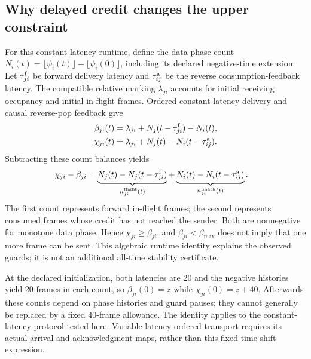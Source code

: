 \subsection{Why delayed credit changes the upper constraint}
For this constant-latency runtime, define the data-phase count
$N_i(t)=\lfloor\psi_i(t)\rfloor-\lfloor\psi_i(0)\rfloor$,
including its declared negative-time extension. Let
$\tau^{\rm f}_{ji}$ be forward delivery latency and
$\tau^{\rm a}_{ij}$ be the reverse consumption-feedback latency.
The compatible relative marking $\lambda_{ji}$ accounts for
initial receiving occupancy and initial in-flight frames. Ordered
constant-latency delivery and causal reverse-pop feedback give
\begin{align}
 \beta_{ji}(t)&=\lambda_{ji}+N_j(t-\tau^{\rm f}_{ji})-N_i(t),\nonumber\\
 \chi_{ji}(t)&=\lambda_{ji}+N_j(t)-N_i(t-\tau^{\rm a}_{ij}).
 \label{eq:safety_delayed_credit_counts}
\end{align}
Subtracting these count balances yields
\begin{align}
 \chi_{ji}-\beta_{ji}
 &=\underbrace{N_j(t)-N_j(t-\tau^{\rm f}_{ji})}_{n^{\rm flight}_{ji}(t)}
   +\underbrace{N_i(t)-N_i(t-\tau^{\rm a}_{ij})}_{n^{\rm unack}_{ji}(t)}.
 \label{eq:safety_delayed_credit_identity}
\end{align}
The first count represents forward in-flight frames; the second
represents consumed frames whose credit has not reached the sender.
Both are nonnegative for monotone data phase. Hence $\chi_{ji}\ge\beta_{ji}$,
and $\beta_{ji}<\beta_{\max}$ does not imply that one more frame can be sent.
This algebraic runtime identity explains the observed guards; it is
not an additional all-time stability certificate.

At the declared initialization, both latencies are 20 and the
negative histories yield 20 frames in each count, so
$\beta_{ji}(0)=z$ while $\chi_{ji}(0)=z+40$.
Afterwards these counts depend on phase histories and guard pauses;
they cannot generally be replaced by a fixed 40-frame allowance.
The identity applies to the constant-latency protocol tested here.
Variable-latency ordered transport requires its actual arrival and
acknowledgment maps, rather than this fixed time-shift expression.

